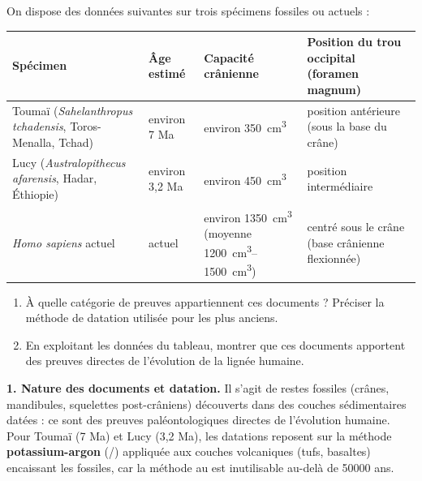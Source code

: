 \documentclass[11pt]{article}
\newcommand{\cle}[1]{{\popxbold\color{popdark}#1}}
\begin{document}
\begin{exoresolu}
On dispose des données suivantes sur trois spécimens fossiles ou actuels :
\begin{center}
\begin{tabularx}{\linewidth}{|l|X|X|X|}
\hline
\rowcolor{popblueL} \textbf{Spécimen} & \textbf{Âge estimé} & \textbf{Capacité crânienne} & \textbf{Position du trou occipital (foramen magnum)} \\
\hline
Toumaï (\emph{Sahelanthropus tchadensis}, Toros-Menalla, Tchad) & environ 7 Ma & environ \SI{350}{cm^3} & position antérieure (sous la base du crâne) \\
\hline
Lucy (\emph{Australopithecus afarensis}, Hadar, Éthiopie) & environ 3,2 Ma & environ \SI{450}{cm^3} & position intermédiaire \\
\hline
\emph{Homo sapiens} actuel & actuel & environ \SI{1350}{cm^3} (moyenne \SIrange{1200}{1500}{cm^3}) & centré sous le crâne (base crânienne flexionnée) \\
\hline
\end{tabularx}
\end{center}
\begin{enumerate}
\item À quelle catégorie de preuves appartiennent ces documents ? Préciser la méthode de datation utilisée pour les plus anciens.
\item En exploitant les données du tableau, montrer que ces documents apportent des preuves directes de l'évolution de la lignée humaine.
\end{enumerate}
\tcblower
\textbf{1. Nature des documents et datation.} Il s'agit de restes fossiles (crânes, mandibules, squelettes post-crâniens) découverts dans des couches sédimentaires datées : ce sont des preuves \cle{paléontologiques} directes de l'évolution humaine. Pour Toumaï (7 Ma) et Lucy (3,2 Ma), les datations reposent sur la méthode \textbf{potassium-argon} (/) appliquée aux couches volcaniques (tufs, basaltes) encaissant les fossiles, car la méthode au  est inutilisable au-delà de \num{50000} ans.


\end{exoresolu}
\end{document}
